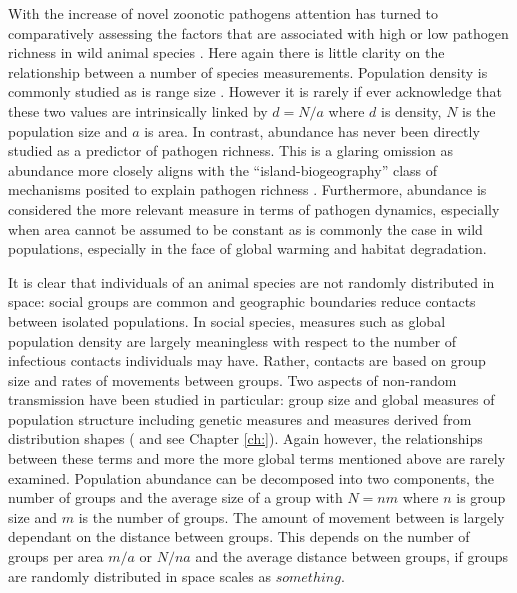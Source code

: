 With the increase of novel zoonotic pathogens \cite{} attention has turned to comparatively assessing the factors that are associated with high or low pathogen richness in wild animal species \cite{morand review}.
Here again there is little clarity on the relationship between a number of species measurements.
Population density is commonly studied \cite{} as is range size \cite{}.
However it is rarely if ever acknowledge that these two values are intrinsically linked by $d = N/a$ where $d$ is density, $N$ is the population size and $a$ is area.
In contrast, abundance has never been directly studied as a predictor of pathogen richness.
This is  a glaring omission as abundance more closely aligns with the ``island-biogeography'' class of mechanisms posited to explain pathogen richness \cite{}.
Furthermore, abundance is considered the more relevant measure in terms of pathogen dynamics, especially when area cannot be assumed to be constant \cite{begon} as is commonly the case in wild populations, especially in the face of global warming and habitat degradation.

It is clear that individuals of an animal species are not randomly distributed in space: social groups are common \cite{} and geographic boundaries reduce contacts between isolated populations.
In social species, measures such as global population density are largely meaningless with respect to the number of infectious contacts individuals may have.
Rather, contacts are based on group size and rates of movements between groups.
Two aspects of non-random transmission have been studied in particular: group size \cite{nunn and others} and global measures of population structure including genetic measures and measures derived from distribution shapes (\textcite{gay, maganga, turmelle} and see Chapter \ref{ch:}).
Again however, the relationships between these terms and more the more global terms mentioned above are rarely examined.
Population abundance can be decomposed into two components, the number of groups and the average size of a group with $N = nm$ where $n$ is group size and $m$ is the number of groups.
The amount of movement between is largely dependant on the distance between groups.
This depends on the number of groups per area $m/a$ or $N/na$ and the average distance between groups, if groups are randomly distributed in space scales as $something$.



